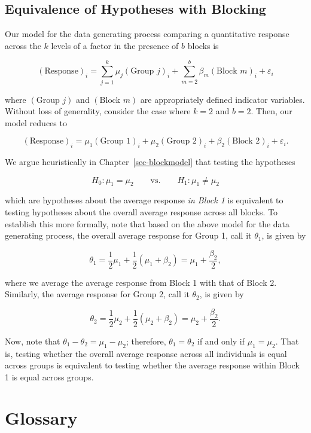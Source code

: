 \documentclass[
  letterpaper,
  DIV=11,
  numbers=noendperiod]{scrreprt}
\theoremstyle{plain}
\theoremstyle{definition}
\theoremstyle{definition}
\theoremstyle{remark}
\begin{document}
\section{Equivalence of Hypotheses with
Blocking}\label{equivalence-of-hypotheses-with-blocking}

Our model for the data generating process comparing a quantitative
response across the \(k\) levels of a factor in the presence of \(b\)
blocks is

\[(\text{Response})_i = \sum_{j=1}^{k} \mu_j (\text{Group } j)_i + \sum_{m=2}^{b} \beta_m (\text{Block } m)_i + \varepsilon_i\]

where \((\text{Group } j)\) and \((\text{Block } m)\) are appropriately
defined indicator variables. Without loss of generality, consider the
case where \(k = 2\) and \(b = 2\). Then, our model reduces to

\[(\text{Response})_i = \mu_1 (\text{Group 1})_i + \mu_2 (\text{Group 2})_i + \beta_2 (\text{Block 2})_i + \varepsilon_i.\]

We argue heuristically in Chapter~\ref{sec-blockmodel} that testing the
hypotheses

\[H_0: \mu_1 = \mu_2 \qquad \text{vs.} \qquad H_1: \mu_1 \neq \mu_2\]

which are hypotheses about the average response \emph{in Block 1} is
equivalent to testing hypotheses about the overall average response
across all blocks. To establish this more formally, note that based on
the above model for the data generating process, the overall average
response for Group 1, call it \(\theta_1\), is given by

\[\theta_1 = \frac{1}{2} \mu_1 + \frac{1}{2} \left(\mu_1 + \beta_2\right) = \mu_1 + \frac{\beta_2}{2},\]

where we average the average response from Block 1 with that of Block 2.
Similarly, the average response for Group 2, call it \(\theta_2\), is
given by

\[\theta_2 = \frac{1}{2} \mu_2 + \frac{1}{2} \left(\mu_2 + \beta_2\right) = \mu_2 + \frac{\beta_2}{2}.\]

Now, note that \(\theta_1 - \theta_2 = \mu_1 - \mu_2\); therefore,
\(\theta_1 = \theta_2\) if and only if \(\mu_1 = \mu_2\). That is,
testing whether the overall average response across all individuals is
equal across groups is equivalent to testing whether the average
response within Block 1 is equal across groups.

\chapter{Glossary}\label{glossary}
\end{document}
